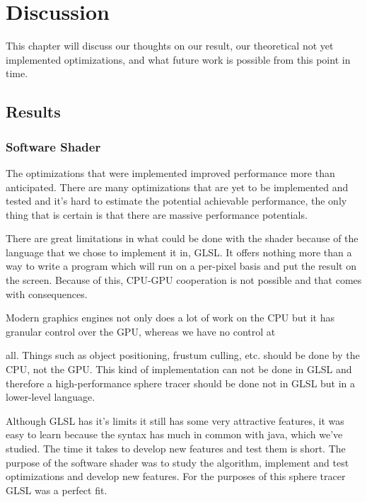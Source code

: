 \chapter{Discussion} 

	This chapter will discuss our thoughts on our result, our theoretical not
	yet	implemented optimizations, and what future work is possible from this
	point in time.
	
	\section{Results}  \label{discussion}
		
		\subsection{Software Shader}

			The optimizations that were implemented improved performance more
			than anticipated. There are many optimizations that are yet to be
			implemented and tested and it's hard to estimate the potential
			achievable performance, the only thing that is certain is that
			there are massive performance potentials.

			There are great limitations in what could be done with the shader
			because of the language that we chose to implement it in, GLSL. It
			offers nothing more than a way to write a program which will run on
			a per-pixel basis and put the result on the screen. Because of
			this, CPU-GPU cooperation is not possible and that comes with
			consequences.

			Modern graphics engines not only does a lot of work on the CPU but
			it has granular control over the GPU, whereas we have no control at

			all. Things such as object positioning, frustum culling, etc.
			should be done by the CPU, not the GPU. This kind of implementation
			can not be done in GLSL and therefore a high-performance sphere
			tracer should be done not in GLSL but in a lower-level language.

			Although GLSL has it's limits it still has some very attractive
			features, it was easy to learn because the syntax has much in
			common with java, which we've studied. The time it takes to develop
			new features and test them is short. The purpose of the software
			shader was to study the algorithm, implement and test optimizations
			and develop new features. For the purposes of this sphere tracer
			GLSL was a perfect fit.
		
